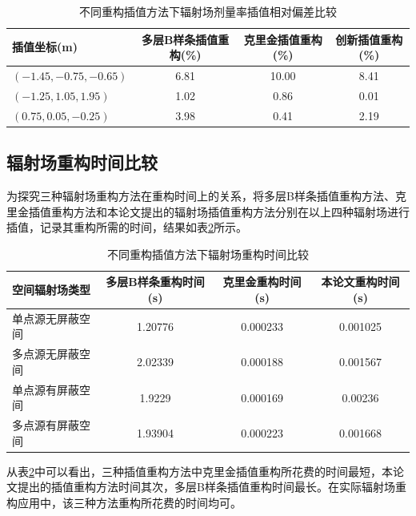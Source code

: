 \begin{table}[htbp]
    \centering
    \caption{\label{tab:test3}不同重构插值方法下辐射场剂量率插值相对偏差比较}
    \begin{tabular}{lccc}
        \toprule
        插值坐标(m)             & 多层B样条插值重构(\%) & 克里金插值重构(\%) & 创新插值重构(\%) \\
        \midrule
        $ (-1.45,-0.75,-0.65) $ & 6.81                  & 10.00              & 8.41             \\
        $ (-1.25,1.05,1.95) $   & 1.02                  & 0.86               & 0.01             \\
        $ (0.75,0.05,-0.25) $   & 3.98                  & 0.41               & 2.19             \\
        \bottomrule
    \end{tabular}
    \label{不同重构插值方法下辐射场剂量率插值相对偏差比较}
\end{table}

\subsection{辐射场重构时间比较}
为探究三种辐射场重构方法在重构时间上的关系，将多层B样条插值重构方法、克里金插值重构方法和本论文提出的辐射场插值重构方法分别在以上四种辐射场进行插值，记录其重构所需的时间，结果如表\ref{不同重构插值方法下辐射场重构时间比较}所示。

\begin{table}[htbp]
    \centering
    \caption{\label{tab:test4}不同重构插值方法下辐射场重构时间比较}
    \begin{tabular}{lccc}
        \toprule
        空间辐射场类型   & 多层B样条重构时间(s) & 克里金重构时间(s) & 本论文重构时间(s) \\
        \midrule
        单点源无屏蔽空间 & 1.20776              & 0.000233          & 0.001025          \\
        多点源无屏蔽空间 & 2.02339              & 0.000188          & 0.001567          \\
        单点源有屏蔽空间 & 1.9229               & 0.000169          & 0.00236           \\
        多点源有屏蔽空间 & 1.93904              & 0.000223          & 0.001668          \\
        \bottomrule
    \end{tabular}
    \label{不同重构插值方法下辐射场重构时间比较}
\end{table}

从表\ref{不同重构插值方法下辐射场重构时间比较}中可以看出，三种插值重构方法中克里金插值重构所花费的时间最短，本论文提出的插值重构方法时间其次，多层B样条插值重构时间最长。在实际辐射场重构应用中，该三种方法重构所花费的时间均可。
